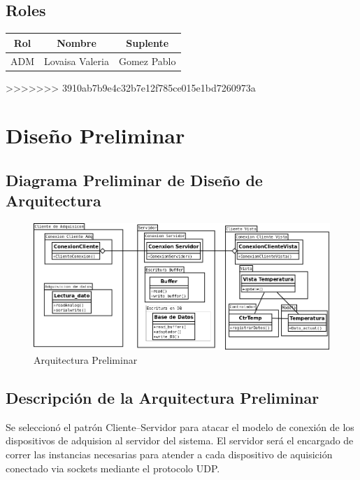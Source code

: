 \subsection{\textcolor[gray]{.2}{Roles}}
\begin{table}[!h]
\begin{center}
\begin{tabular}{|c|c|c|}
\hline
\rowcolor[gray]{.8} Rol & Nombre & Suplente\\
\hline
ADM & Lovaisa Valeria & Gomez Pablo\\
\hline
\end{tabular}
\end{center}
\end{table}
>>>>>>> 3910ab7b9e4c32b7e12f785ce015e1bd7260973a

\newpage
\section{\textcolor[gray]{.2}{Diseño Preliminar}}
\subsection{\textcolor[gray]{.2}{Diagrama Preliminar de Diseño de Arquitectura}}
\begin{figure}[h!]
 \begin{center}
  \includegraphics[width=1\textwidth,keepaspectratio=true]{./img/arqprelim.png}
  \caption{Arquitectura Preliminar}
  \label{fig:esquema}
 \end{center}
\end{figure}

\subsection{\textcolor[gray]{.2}{Descripción de la Arquitectura Preliminar}}
Se seleccionó el patrón Cliente–Servidor para atacar el modelo de conexión de
los dispositivos de adquision al servidor del sistema. El servidor será el
encargado de correr las instancias necesarias para atender a cada dispositivo
de aquisición conectado via sockets mediante el protocolo UDP.

